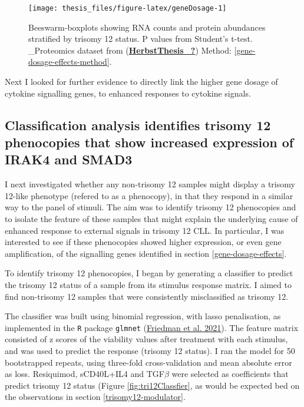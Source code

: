 \documentclass[11pt, a4paper, twosided]{book}
\begin{document}
\begin{figure}

{\centering \texttt{[image: thesis\_files/figure-latex/geneDosage-1]} 

}

\caption{Beeswarm-boxplots showing RNA counts and protein abundances stratified by trisomy 12 status. P values from Student's t-test. \_Proteomics dataset from (\protect\hyperlink{ref-HerbstThesis_}{\textbf{HerbstThesis\_?}}) Method: \ref{gene-dosage-effects-method}.}\label{fig:geneDosage}
\end{figure}
Next I looked for further evidence to directly link the higher gene dosage of cytokine signalling genes, to enhanced responses to cytokine signals.

\hypertarget{trisomy12-classifier}{%
\subsection{Classification analysis identifies trisomy 12 phenocopies that show increased expression of IRAK4 and SMAD3}\label{trisomy12-classifier}}

I next investigated whether any non-trisomy 12 samples might display a trisomy 12-like phenotype (refered to as a phenocopy), in that they respond in a similar way to the panel of stimuli. The aim was to identify trisomy 12 phenocopies and to isolate the feature of these samples that might explain the underlying cause of enhanced response to external signals in trisomy 12 CLL. In particular, I was interested to see if these phenocopies showed higher expression, or even gene amplification, of the signalling genes identified in section \ref{gene-dosage-effects}.

To identify trisomy 12 phenocopies, I began by generating a classifier to predict the trisomy 12 status of a sample from its stimulus response matrix. I aimed to find non-trisomy 12 samples that were consistently misclassified as trisomy 12.

The classifier was built using binomial regression, with lasso penalisation, as implemented in the \texttt{R} package \texttt{glmnet} (\protect\hyperlink{ref-R-glmnet}{Friedman et al. 2021}). The feature matrix consisted of z scores of the viability values after treatment with each stimulus, and was used to predict the response (trisomy 12 status). I ran the model for 50 bootstrapped repeats, using three-fold cross-validation and mean absolute error as loss. Resiquimod, sCD40L+IL4 and TGF\(\beta\) were selected as coefficients that predict trisomy 12 status (Figure \ref{fig:tri12Classfier}, as would be expected bed on the observations in section \ref{trisomy12-modulator}.
\end{document}
